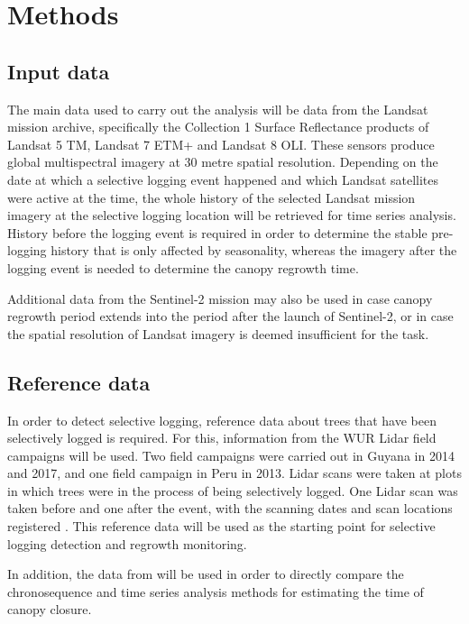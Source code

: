 \documentclass[a4paper,10pt]{article}
\begin{document}
\section{Methods}

\subsection{Input data}

The main data used to carry out the analysis will be data from the Landsat mission archive, specifically the Collection 1 Surface Reflectance products of Landsat 5 \ac{TM}, Landsat 7 \ac{ETM+} and Landsat 8 {OLI}. These sensors produce global multispectral imagery at 30 metre spatial resolution. Depending on the date at which a selective logging event happened and which Landsat satellites were active at the time, the whole history of the selected Landsat mission imagery at the selective logging location will be retrieved for time series analysis. History before the logging event is required in order to determine the stable pre-logging history that is only affected by seasonality, whereas the imagery after the logging event is needed to determine the canopy regrowth time.

Additional data from the Sentinel-2 mission may also be used in case canopy regrowth period extends into the period after the launch of Sentinel-2, or in case the spatial resolution of Landsat imagery is deemed insufficient for the task.

\subsection{Reference data}

In order to detect selective logging, reference data about trees that have been selectively logged is required. For this, information from the \ac{WUR} Lidar field campaigns will be used. Two field campaigns were carried out in Guyana in 2014 and 2017, and one field campaign in Peru in 2013. Lidar scans were taken at plots in which trees were in the process of being selectively logged. One Lidar scan was taken before and one after the event, with the scanning dates and scan locations registered \citep{gonzalez_de_tanago_estimation_2017}. This reference data will be used as the starting point for selective logging detection and regrowth monitoring.

In addition, the data from \citet{broadbent_recovery_2006} will be used in order to directly compare the chronosequence and time series analysis methods for estimating the time of canopy closure.
\end{document}
